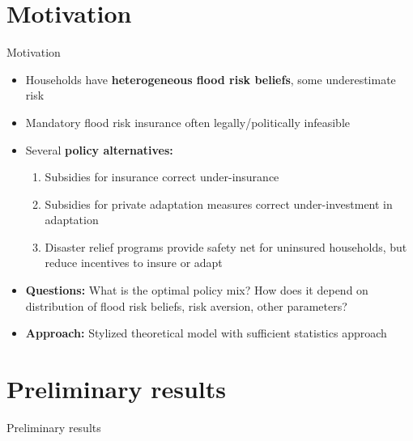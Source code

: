 \documentclass[xcolor=dvipsnames, aspectratio = 169]{beamer}
\begin{document}
\maketitle

{ %
\AtBeginSection{} %

\section{Motivation}

\begin{frame}{Motivation}
    \begin{itemize}
    	\setlength{\itemsep}{0.3cm}
        \item Households have \textbf{heterogeneous flood risk beliefs}, some underestimate risk
        \item Mandatory flood risk insurance often legally/politically infeasible 
        \item Several \textbf{policy alternatives:} 
        \begin{enumerate}[label=\arabic*.] 
            \item Subsidies for insurance correct under-insurance
            \item Subsidies for private adaptation measures correct under-investment in adaptation
            \item Disaster relief programs provide safety net for uninsured households, but reduce incentives to insure or adapt
        \end{enumerate}
        \item \textbf{Questions:} What is the optimal policy mix? How does it depend on distribution of flood risk beliefs, risk aversion, other parameters?
        \item \textbf{Approach:} Stylized theoretical model with sufficient statistics approach
    \end{itemize}
\end{frame}

\section{Preliminary results}

\begin{frame}{Preliminary results}


\end{frame}}
\end{document}

